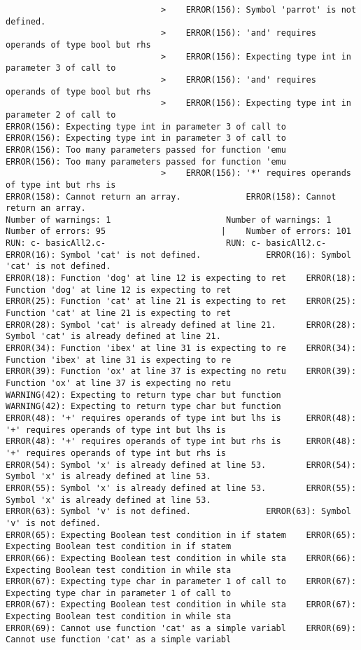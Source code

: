 \documentclass[12pt]{book}
\begin{document}
\begin{lstlisting}
							   >	ERROR(156): Symbol 'parrot' is not defined.
							   >	ERROR(156): 'and' requires operands of type bool but rhs
							   >	ERROR(156): Expecting type int in parameter 3 of call to
							   >	ERROR(156): 'and' requires operands of type bool but rhs
							   >	ERROR(156): Expecting type int in parameter 2 of call to
ERROR(156): Expecting type int in parameter 3 of call to	ERROR(156): Expecting type int in parameter 3 of call to
ERROR(156): Too many parameters passed for function 'emu	ERROR(156): Too many parameters passed for function 'emu
							   >	ERROR(156): '*' requires operands of type int but rhs is
ERROR(158): Cannot return an array.				ERROR(158): Cannot return an array.
Number of warnings: 1						Number of warnings: 1
Number of errors: 95					   |	Number of errors: 101
RUN: c- basicAll2.c-						RUN: c- basicAll2.c-
ERROR(16): Symbol 'cat' is not defined.				ERROR(16): Symbol 'cat' is not defined.
ERROR(18): Function 'dog' at line 12 is expecting to ret	ERROR(18): Function 'dog' at line 12 is expecting to ret
ERROR(25): Function 'cat' at line 21 is expecting to ret	ERROR(25): Function 'cat' at line 21 is expecting to ret
ERROR(28): Symbol 'cat' is already defined at line 21.		ERROR(28): Symbol 'cat' is already defined at line 21.
ERROR(34): Function 'ibex' at line 31 is expecting to re	ERROR(34): Function 'ibex' at line 31 is expecting to re
ERROR(39): Function 'ox' at line 37 is expecting no retu	ERROR(39): Function 'ox' at line 37 is expecting no retu
WARNING(42): Expecting to return type char but function 	WARNING(42): Expecting to return type char but function 
ERROR(48): '+' requires operands of type int but lhs is 	ERROR(48): '+' requires operands of type int but lhs is 
ERROR(48): '+' requires operands of type int but rhs is 	ERROR(48): '+' requires operands of type int but rhs is 
ERROR(54): Symbol 'x' is already defined at line 53.		ERROR(54): Symbol 'x' is already defined at line 53.
ERROR(55): Symbol 'x' is already defined at line 53.		ERROR(55): Symbol 'x' is already defined at line 53.
ERROR(63): Symbol 'v' is not defined.				ERROR(63): Symbol 'v' is not defined.
ERROR(65): Expecting Boolean test condition in if statem	ERROR(65): Expecting Boolean test condition in if statem
ERROR(66): Expecting Boolean test condition in while sta	ERROR(66): Expecting Boolean test condition in while sta
ERROR(67): Expecting type char in parameter 1 of call to	ERROR(67): Expecting type char in parameter 1 of call to
ERROR(67): Expecting Boolean test condition in while sta	ERROR(67): Expecting Boolean test condition in while sta
ERROR(69): Cannot use function 'cat' as a simple variabl	ERROR(69): Cannot use function 'cat' as a simple variabl

\end{lstlisting}
\end{document}
